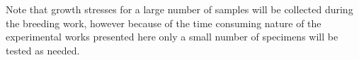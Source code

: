 Note that growth stresses for a large number of samples will be collected during
the breeding work, however because of the time consuming nature of the
experimental works presented here only a small number of specimens will be
tested as needed.